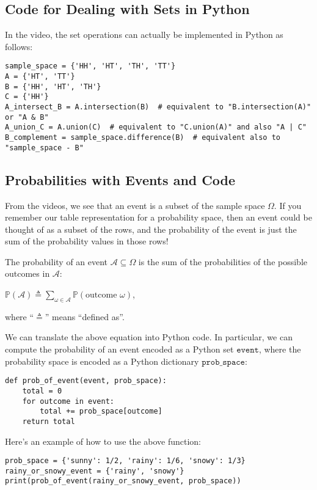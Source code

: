 \documentclass[6008notes.tex]{subfiles}
\begin{document}
\subsection{Code for Dealing with Sets in Python}

In the video, the set operations can actually be implemented in Python as follows:

\begin{lstlisting}
sample_space = {'HH', 'HT', 'TH', 'TT'}
A = {'HT', 'TT'}
B = {'HH', 'HT', 'TH'}
C = {'HH'}
A_intersect_B = A.intersection(B)  # equivalent to "B.intersection(A)" or "A & B"
A_union_C = A.union(C)  # equivalent to "C.union(A)" and also "A | C"
B_complement = sample_space.difference(B)  # equivalent also to "sample_space - B"
\end{lstlisting}

\subsection{Probabilities with Events and Code}

From the videos, we see that an event is a subset of the sample space $\Omega$. If you remember our table representation for a probability space, then an event could be thought of as a subset of the rows, and the probability of the event is just the sum of the probability values in those rows!

The probability of an event $\mathcal{A}\subseteq \Omega$ is the sum of the probabilities of the possible outcomes in $\mathcal{A}$:

$\mathbb {P}(\mathcal{A})\triangleq \sum _{\omega \in \mathcal{A}}\mathbb {P}(\text {outcome }\omega )$,
 
where ``$\triangleq$'' means ``defined as''.

We can translate the above equation into Python code. In particular, we can compute the probability of an event encoded as a Python set $\texttt{event}$, where the probability space is encoded as a Python dictionary $\texttt{prob\_space}$:

\begin{lstlisting}
def prob_of_event(event, prob_space):
    total = 0
    for outcome in event:
        total += prob_space[outcome]
    return total
\end{lstlisting}

Here's an example of how to use the above function:

\begin{lstlisting}
prob_space = {'sunny': 1/2, 'rainy': 1/6, 'snowy': 1/3}
rainy_or_snowy_event = {'rainy', 'snowy'}
print(prob_of_event(rainy_or_snowy_event, prob_space))
\end{lstlisting}
\end{document}
